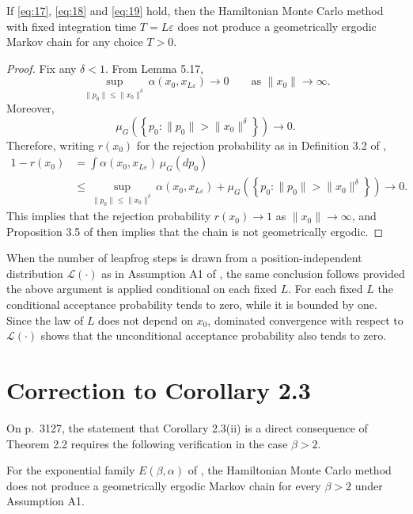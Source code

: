 \begin{theorem514}
If \eqref{eq:17}, \eqref{eq:18} and \eqref{eq:19} hold, then the Hamiltonian
Monte Carlo method with fixed integration time $T=L\varepsilon$ does not
produce a geometrically ergodic Markov chain for any choice $T>0$.
\end{theorem514}

\begin{proof}
Fix any $\delta<1$. From Lemma 5.17,
\[
 \sup_{\|p_0\|\leq\|x_0\|^\delta}
 \alpha(x_0,x_{L\varepsilon})\longrightarrow0
 \qquad\text{as }\|x_0\|\to\infty.
\]
Moreover,
\[
 \mu_G\!\left(\left\{p_0:\|p_0\|>\|x_0\|^\delta\right\}\right)
 \longrightarrow0.
\]
Therefore, writing $r(x_0)$ for the rejection probability as in Definition
3.2 of \cite{Livingstone2019},
\begin{align*}
 1-r(x_0)
 &=\int\alpha(x_0,x_{L\varepsilon})\,\mu_G(dp_0)\\
 &\leq
 \sup_{\|p_0\|\leq\|x_0\|^\delta}
 \alpha(x_0,x_{L\varepsilon})
 +\mu_G\!\left(\left\{p_0:\|p_0\|>\|x_0\|^\delta\right\}\right)
 \longrightarrow0.
\end{align*}
This implies that the rejection probability $r(x_0)\to1$ as $\|x_0\|\to\infty$, and Proposition 3.5 of
\cite{Livingstone2019} then implies that the chain is not geometrically ergodic.
\end{proof}

When the number of leapfrog steps is drawn from a position-independent
distribution $\mathcal{L}(\cdot)$ as in Assumption A1 of \cite{Livingstone2019}, the
same conclusion follows provided the above argument is applied conditional on
each fixed $L$. For each fixed $L$ the conditional acceptance probability
tends to zero, while it is bounded by one. Since the law of $L$ does not
depend on $x_0$, dominated convergence with respect to $\mathcal{L}(\cdot)$ shows that
the unconditional acceptance probability also tends to zero.

\section{Correction to Corollary 2.3}

On p.~3127, the statement that Corollary 2.3(ii) is a direct consequence of
Theorem 2.2 requires the following verification in the case $\beta>2$.

\begin{corollary23}
For the exponential family $E(\beta,\alpha)$ of \cite{Livingstone2019}, the
Hamiltonian Monte Carlo method does not produce a geometrically ergodic
Markov chain for every $\beta>2$ under Assumption A1.
\end{corollary23}

